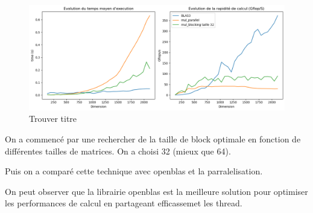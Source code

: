 \documentclass{report}
\begin{document}
\begin{figure}[H]
    \centering
    \includegraphics[width=0.7\linewidth]{images/fig9.png}
    \caption{Trouver titre}
    \label{fig:9}
\end{figure}

On a commencé par une rechercher de la taille de block optimale en fonction de différentes tailles de matrices. On a choisi 32 (mieux que 64).

Puis on a comparé cette technique avec openblas et la parralelisation.

On peut observer que la librairie openblas est la meilleure solution pour optimiser les performances de calcul en partageant efficassemet les thread.



\end{document}

